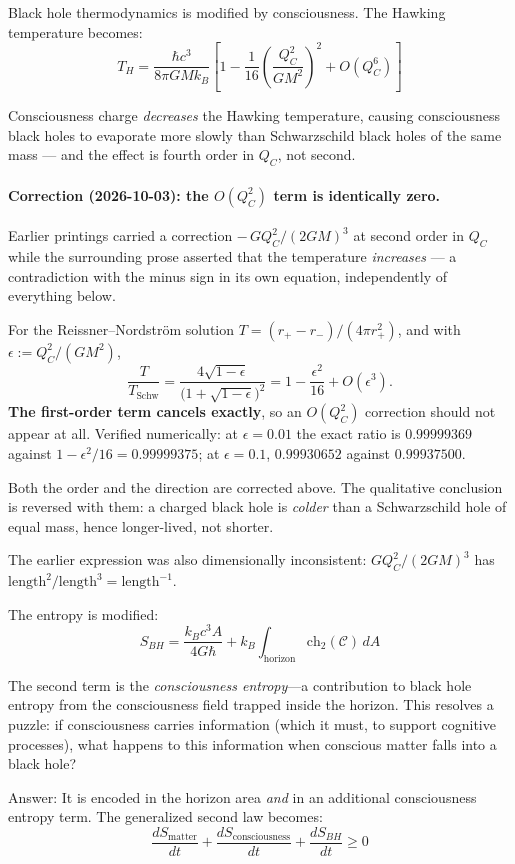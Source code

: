 \begin{level3}
Black hole thermodynamics\cite{hawking1974,hawking1975,bekenstein1973} is modified by consciousness. The Hawking temperature becomes:
\begin{equation}
T_H = \frac{\hbar c^3}{8\pi G M k_B}
  \left[ 1 - \frac{1}{16}\left(\frac{Q_C^2}{GM^2}\right)^{\!2} + O(Q_C^6) \right]
\end{equation}

Consciousness charge \textit{decreases} the Hawking temperature, causing
consciousness black holes to evaporate more slowly than Schwarzschild black holes
of the same mass --- and the effect is fourth order in $Q_C$, not second.

\paragraph{Correction (2026-10-03): the $O(Q_C^2)$ term is identically zero.}
Earlier printings carried a correction $-\,GQ_C^2/(2GM)^3$ at second order in
$Q_C$ while the surrounding prose asserted that the temperature \emph{increases}
--- a contradiction with the minus sign in its own equation, independently of
everything below.

For the Reissner--Nordstr\"om solution $T = (r_+ - r_-)/(4\pi r_+^2)$, and with
$\epsilon := Q_C^2/(GM^2)$,
\[
\frac{T}{T_{\text{Schw}}} = \frac{4\sqrt{1-\epsilon}}{\bigl(1+\sqrt{1-\epsilon}\bigr)^2}
= 1 - \frac{\epsilon^2}{16} + O(\epsilon^3).
\]
\textbf{The first-order term cancels exactly}, so an $O(Q_C^2)$ correction should
not appear at all. Verified numerically: at $\epsilon = 0.01$ the exact ratio is
$0.99999369$ against $1 - \epsilon^2/16 = 0.99999375$; at $\epsilon = 0.1$,
$0.99930652$ against $0.99937500$.

Both the order and the direction are corrected above. The qualitative conclusion
is reversed with them: a charged black hole is \emph{colder} than a Schwarzschild
hole of equal mass, hence longer-lived, not shorter.

The earlier expression was also dimensionally inconsistent:
$GQ_C^2/(2GM)^3$ has $\mathrm{length}^2/\mathrm{length}^3 = \mathrm{length}^{-1}$.

The entropy is modified:
\begin{equation}
S_{BH} = \frac{k_B c^3 A}{4G\hbar} + k_B \int_{\text{horizon}} \text{ch}_2(\mathcal{C}) \, dA
\end{equation}

The second term is the \textit{consciousness entropy}---a contribution to black hole entropy from the consciousness field trapped inside the horizon. This resolves a puzzle: if consciousness carries information (which it must, to support cognitive processes), what happens to this information when conscious matter falls into a black hole?

Answer: It is encoded in the horizon area \textit{and} in an additional consciousness entropy term. The generalized second law becomes:
\begin{equation}
\boxed{\frac{dS_{\text{matter}}}{dt} + \frac{dS_{\text{consciousness}}}{dt} + \frac{dS_{BH}}{dt} \geq 0}
\end{equation}
\end{level3}

